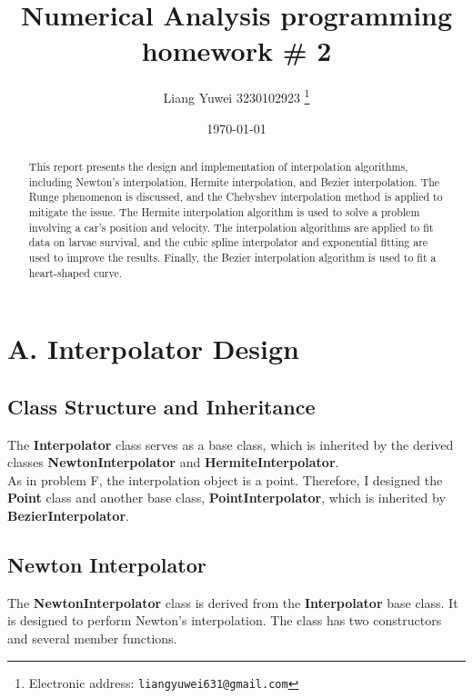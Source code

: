 \documentclass[a4paper]{article}
\begin{document}
\title{Numerical Analysis  programming homework \# 2}

\author{Liang Yuwei 3230102923
  \thanks{Electronic address: \texttt{liangyuwei631@gmail.com}}}


\date{\today}

\maketitle

\begin{abstract}
  This report presents the design and implementation of interpolation algorithms, including Newton's interpolation, Hermite interpolation, and Bezier interpolation. The Runge phenomenon is discussed, and the Chebyshev interpolation method is applied to mitigate the issue. The Hermite interpolation algorithm is used to solve a problem involving a car's position and velocity. The interpolation algorithms are applied to fit data on larvae survival, and the cubic spline interpolator and exponential fitting are used to improve the results. Finally, the Bezier interpolation algorithm is used to fit a heart-shaped curve.
\end{abstract}

\section{A. Interpolator Design}

\subsection{Class Structure and Inheritance}
The \textbf{Interpolator} class serves as a base class, which is inherited by the derived classes \textbf{NewtonInterpolator} and \textbf{HermiteInterpolator}.\\
As in problem F, the interpolation object is a point. Therefore, I designed the \textbf{Point} class and another base class, \textbf{PointInterpolator}, which is inherited by \textbf{BezierInterpolator}.

\subsection{Newton Interpolator}
The \textbf{NewtonInterpolator} class is derived from the \textbf{Interpolator} base class. It is designed to perform Newton's interpolation. The class has two constructors and several member functions.
\end{document}
